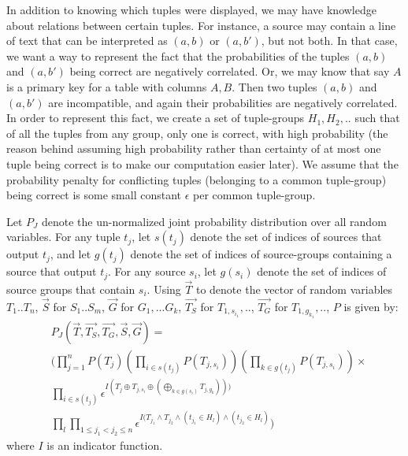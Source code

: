 \documentclass{sig-alternate}
\newcounter{prob}
\begin{document}
In addition to knowing which tuples were displayed, we may have knowledge about relations between certain tuples. For instance, a source may contain a line of text that can be interpreted as $(a,b)$ or $(a, b')$, but not both. In that case, we want a way to represent the fact that the probabilities of the tuples $(a, b)$ and $(a, b')$ being correct are negatively correlated. Or, we may know that say $A$ is a primary key for a table with columns $A,B$. Then two tuples $(a,b)$ and $(a,b')$ are incompatible, and again their probabilities are negatively correlated. In order to represent this fact, we create a set of tuple-groups $H_1, H_2, ..$ such that of all the tuples from any group, only one is correct, with high probability (the reason behind assuming high probability rather than certainty of at most one tuple being correct is to make our computation easier later). We assume that the probability penalty for conflicting tuples (belonging to a common tuple-group) being correct is some small constant $\epsilon$ per common tuple-group. 

Let $P_J$ denote the un-normalized joint probability distribution over all random variables. For any tuple $t_j$, let $s(t_j)$ denote the set of indices of sources that output $t_j$, and let $g(t_j)$ denote the set of indices of source-groups containing a source that output $t_j$. For any source $s_i$, let $g(s_i)$ denote the set of indices of source groups that contain $s_i$. 
Using $\overrightarrow{T}$ to denote the vector of random variables $T_1..T_n$, $\overrightarrow{S}$ for $S_1..S_m$, $\overrightarrow{G}$ for $G_1, ... G_k$, $\overrightarrow{T_S}$ for $T_{1, s_{i_1}}, ..$, $\overrightarrow{T_G}$ for $T_{1, g_{k_1}}, ..$, $P$ is given by:
\begin{align*} 
& P_J(\overrightarrow{T}, \overrightarrow{T_S}, \overrightarrow{T_G}, \overrightarrow{S}, \overrightarrow{G}) =
\\& (\prod_{j=1}^{n} P(T_j) (\prod_{i\in s(t_j)} P(T_{j, s_i})) (\prod_{k\in g(t_j)} P(T_{j, s_i})) \times 
\\& \prod_{i\in s(t_j)} \epsilon^{I(T_j \oplus T_{j, s_i} \oplus(\bigoplus_{k\in g(s_i)} T_{j, g_k})))}
\\& \prod_{l} \prod_{1 \leq j_1 < j_2 \leq n} \epsilon^{I(T_{j_1} \land T_{j_2} \land (t_{j_1}\in H_l) \land (t_{j_2} \in H_l)})
\end{align*}
where $I$ is an indicator function.

\end{document}

